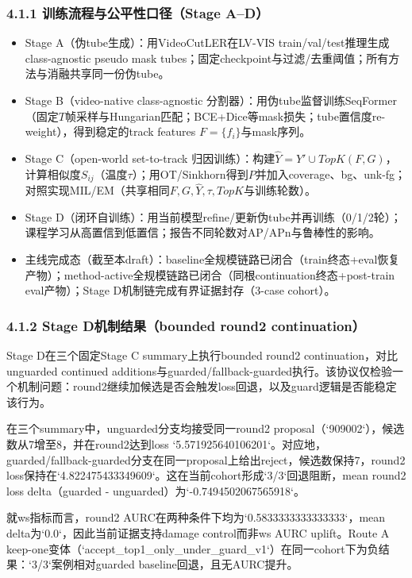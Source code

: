 \documentclass[UTF8]{ctexart}
\begin{document}
\subsubsection*{4.1.1 训练流程与公平性口径（Stage A--D）}
\begin{itemize}
\item Stage A（伪tube生成）：用VideoCutLER在LV-VIS train/val/test推理生成class-agnostic pseudo mask tubes；固定checkpoint与过滤/去重阈值；所有方法与消融共享同一份伪tube。
\item Stage B（video-native class-agnostic 分割器）：用伪tube监督训练SeqFormer（固定$T$帧采样与Hungarian匹配；BCE+Dice等mask损失；tube置信度re-weight），得到稳定的track features $F=\{f_i\}$与mask序列。
\item Stage C（open-world set-to-track 归因训练）：构建$\hat{Y}=Y'\cup TopK(F,G)$，计算相似度$S_{ij}$（温度$\tau$）；用OT/Sinkhorn得到$P$并加入coverage、bg、unk-fg；对照实现MIL/EM（共享相同$F,G,\hat{Y},\tau,TopK$与训练轮数）。
\item Stage D（闭环自训练）：用当前模型refine/更新伪tube并再训练（0/1/2轮）；课程学习从高置信到低置信；报告不同轮数对AP/APn与鲁棒性的影响。
\item 主线完成态（截至本draft）：baseline全规模链路已闭合（train终态+eval恢复产物）；method-active全规模链路已闭合（同根continuation终态+post-train eval产物）；Stage D机制链完成有界证据封存（3-case cohort）。
\end{itemize}

\subsubsection*{4.1.2 Stage D机制结果（bounded round2 continuation）}
Stage D在三个固定Stage C summary上执行bounded round2 continuation，对比unguarded continued additions与guarded/fallback-guarded执行。该协议仅检验一个机制问题：round2继续加候选是否会触发loss回退，以及guard逻辑是否能稳定该行为。

在三个summary中，unguarded分支均接受同一round2 proposal（`909002`），候选数从7增至8，并在round2达到loss `5.571925640106201`。对应地，guarded/fallback-guarded分支在同一proposal上给出reject，候选数保持7，round2 loss保持在`4.822475433349609`。这在当前cohort形成`3/3`回退阻断，mean round2 loss delta（guarded - unguarded）为`-0.7494502067565918`。

就ws指标而言，round2 AURC在两种条件下均为`0.5833333333333333`，mean delta为`0.0`，因此当前证据支持damage control而非ws AURC uplift。Route A keep-one变体（`accept_top1_only_under_guard_v1`）在同一cohort下为负结果：`3/3`案例相对guarded baseline回退，且无AURC提升。
\end{document}
